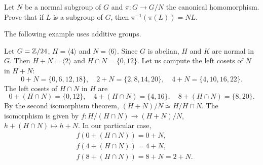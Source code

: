 
\begin{exercise}
Let $N$ be a normal subgroup of $G$ and
$\pi\colon G\to G/N$ the canonical homomorphism. Prove that
if $L$ is a subgroup of $G$, then $\pi^{-1}(\pi(L))=NL$.
\end{exercise}

The following example uses additive groups. 

\begin{example}
Let $G=\mathbb{Z}/24$, $H=\langle 4\rangle$ and $N=\langle 6\rangle$. Since $G$ is abelian, $H$ and $K$ are normal in $G$. Then 
$H+N=\langle 2\rangle$ and $H\cap N=\{0,12\}$. Let us compute
the left cosets of $N$ in $H+N$:
\[
0+N=\{0,6,12,18\},
\quad
2+N=\{2,8,14,20\},
\quad
4+N=\{4,10,16,22\}.
\]
The left cosets of $H\cap N$ in $H$ are 
\[
0+(H\cap N)=\{0,12\},
\quad
4+(H\cap N)=\{4,16\},
\quad
8+(H\cap N)=\{8,20\}.
\]
By the second isomorphism theorem, $(H+N)/N\simeq H/H\cap N$. The
isomorphism is given by 
$f\colon H/(H\cap N)\to (H+N)/N$, $h+(H\cap N)\mapsto h+N$.
In our particular case, 
\begin{align*}
&f(0+(H\cap N))=0+N,\\
&f(4+(H\cap N))=4+N,\\
&f(8+(H\cap N))=8+N=2+N.
\end{align*}
\end{example}

